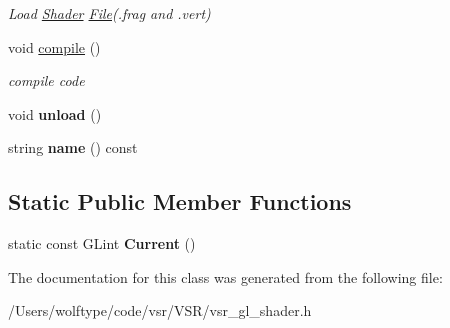 \begin{DoxyCompactItemize}
\begin{DoxyCompactList}\small\item\em Load \hyperlink{classvsr_1_1_shader}{Shader} \hyperlink{classvsr_1_1_file}{File}(.frag and .vert) \end{DoxyCompactList}\item 
\hypertarget{classvsr_1_1_shader_abcd85fdfb4926925c4411179a84e8f40}{void \hyperlink{classvsr_1_1_shader_abcd85fdfb4926925c4411179a84e8f40}{compile} ()}\label{classvsr_1_1_shader_abcd85fdfb4926925c4411179a84e8f40}

\begin{DoxyCompactList}\small\item\em compile code \end{DoxyCompactList}\item 
\hypertarget{classvsr_1_1_shader_acd1f3f1115794954c1a81bbbaa036a3e}{void {\bfseries unload} ()}\label{classvsr_1_1_shader_acd1f3f1115794954c1a81bbbaa036a3e}

\item 
\hypertarget{classvsr_1_1_shader_a34c47f2f57c8b09a0ff7243111619291}{string {\bfseries name} () const }\label{classvsr_1_1_shader_a34c47f2f57c8b09a0ff7243111619291}

\end{DoxyCompactItemize}
\subsection*{Static Public Member Functions}
\begin{DoxyCompactItemize}
\item 
\hypertarget{classvsr_1_1_shader_a9ef86b3d5be9fe0a6ea90efa2c325200}{static const G\-Lint {\bfseries Current} ()}\label{classvsr_1_1_shader_a9ef86b3d5be9fe0a6ea90efa2c325200}

\end{DoxyCompactItemize}


The documentation for this class was generated from the following file\-:\begin{DoxyCompactItemize}
\item 
/\-Users/wolftype/code/vsr/\-V\-S\-R/vsr\-\_\-gl\-\_\-shader.\-h\end{DoxyCompactItemize}
